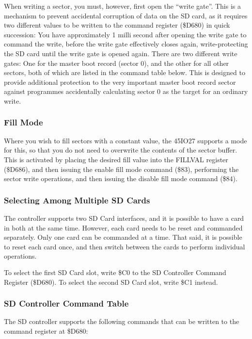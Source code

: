 When writing a sector, you must, however, first open the ``write
gate''. This is a mechanism to prevent accidental corruption of data
on the SD card, as it requires two different values to be written to
the command register (\$D680) in quick succession: You have
approximately 1 milli second after opening the write gate to command
the write, before the write gate effectively closes again,
write-protecting the SD card until the write gate is opened again.
There are two different write gates: One for the master boot record
(sector 0), and the other for all other sectors, both of which are
listed in the command table below. This is designed to provide
additional protection to the very important master boot record sector
against programmes accidentally calculating sector 0 as the target for
an ordinary write.

\subsubsection{Fill Mode}

Where you wish to fill sectors with a constant value, the 45IO27
supports a mode for this, so that you do not need to overwrite the
contents of the sector buffer. This is activated by placing the
desired fill value into the FILLVAL register (\$D686), and then
issuing the enable fill mode command (\$83), performing the sector
write operations, and then issuing the disable fill mode command
(\$84). 

\subsubsection{Selecting Among Multiple SD Cards}

The controller supports two SD Card interfaces, and it is possible to
have a card in both at the same time.  However, each card needs to be
reset and commanded separately.  Only one card can be commanded at a
time.  That said, it is possible to reset each card once, and then
switch between the cards to perform individual operations.

To select the first SD Card slot, write \$C0 to the SD Controller
Command Register (\$D680).  To select the second SD Card slot, write
\$C1 instead.

\subsubsection{SD Controller Command Table}

The SD controller supports the following commands that can be written
to the command register at \$D680:

